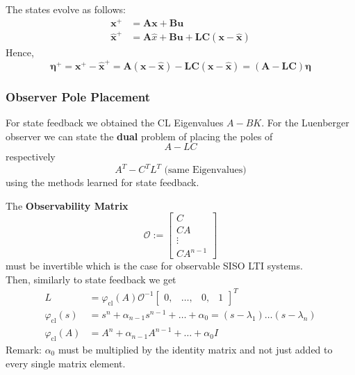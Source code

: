 The states evolve as follows:
\begin{align*}
    \mathbf{x}^+       & =\mathbf{Ax}+\mathbf{Bu}                              \\
    \mathbf{\hat{x}^+} & =\mathbf{A}\hat{x}+\mathbf{Bu}+\mathbf{LC(x-\hat{x})}
\end{align*}
Hence,
\begin{equation*}
    \mathbf{\eta^+}=\mathbf{x^+}-\mathbf{\hat{x}^+}=\mathbf{A}(\mathbf{x}-\mathbf{\hat{x}})-\mathbf{LC}(\mathbf{x}-\mathbf{\hat{x}})=(\mathbf{A}-\mathbf{LC})\mathbf{\eta}
\end{equation*}

\subsubsection{Observer Pole Placement}
For state feedback we obtained the CL Eigenvalues $A-BK$. For the Luenberger observer we can state the \textbf{dual} problem of placing the poles of
\begin{equation*}
    A-LC
\end{equation*}
respectively
\begin{equation*}
    A^T-C^T L^T\text{ (same Eigenvalues)}
\end{equation*}
using the methods learned for state feedback.


The \textbf{Observability Matrix}
\begin{equation*}
    \mathcal{O}:=\begin{bmatrix}C\\CA\\\vdots\\CA^{n-1}\end{bmatrix}
\end{equation*}
must be invertible which is the case for observable SISO LTI systems.\\
Then, similarly to state feedback we get
\begin{align*}
    L                        & =\varphi_{\mathrm{cl}}(A)\mathcal{O}^{-1}\begin{bmatrix}0,&\ldots,&0,&1\end{bmatrix}^T \\
    \varphi_{\mathrm{cl}}(s) & =s^n+\alpha_{n-1}s^{n-1}+\ldots+\alpha_0=(s-\lambda_1)\ldots(s-\lambda_n)              \\
    \varphi_{\mathrm{cl}}(A) & =A^n+\alpha_{n-1}A^{n-1}+\ldots+\alpha_0I
\end{align*}
Remark: $\alpha_0$ must be multiplied by the identity matrix and not just added to every single matrix element.

